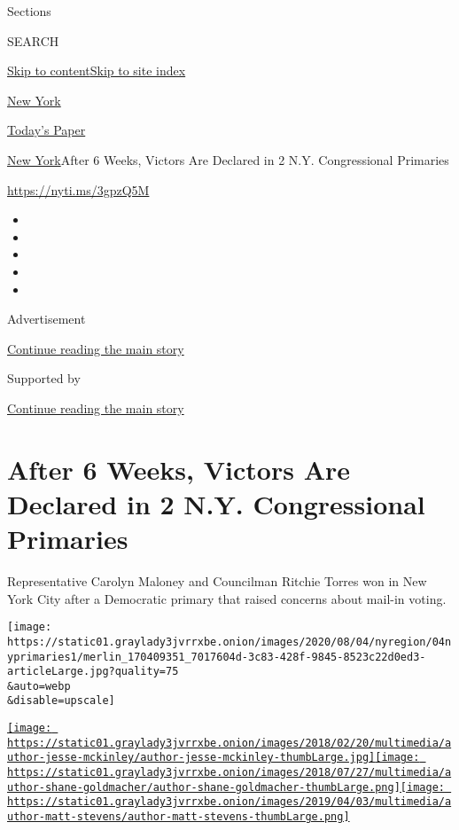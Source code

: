Sections

SEARCH

\protect\hyperlink{site-content}{Skip to
content}\protect\hyperlink{site-index}{Skip to site index}

\href{https://www.nytimes3xbfgragh.onion/section/nyregion}{New York}

\href{https://myaccount.nytimes3xbfgragh.onion/auth/login?response_type=cookie\&client_id=vi}{}

\href{https://www.nytimes3xbfgragh.onion/section/todayspaper}{Today's
Paper}

\href{/section/nyregion}{New York}\textbar{}After 6 Weeks, Victors Are
Declared in 2 N.Y. Congressional Primaries

\url{https://nyti.ms/3gpzQ5M}

\begin{itemize}
\item
\item
\item
\item
\item
\end{itemize}

Advertisement

\protect\hyperlink{after-top}{Continue reading the main story}

Supported by

\protect\hyperlink{after-sponsor}{Continue reading the main story}

\hypertarget{after-6-weeks-victors-are-declared-in-2-ny-congressional-primaries}{%
\section{After 6 Weeks, Victors Are Declared in 2 N.Y. Congressional
Primaries}\label{after-6-weeks-victors-are-declared-in-2-ny-congressional-primaries}}

Representative Carolyn Maloney and Councilman Ritchie Torres won in New
York City after a Democratic primary that raised concerns about mail-in
voting.

\texttt{[image: https://static01.graylady3jvrrxbe.onion/images/2020/08/04/nyregion/04nyprimaries1/merlin\_170409351\_7017604d-3c83-428f-9845-8523c22d0ed3-articleLarge.jpg?quality=75\\\&auto=webp\\\&disable=upscale]}

\href{https://www.nytimes3xbfgragh.onion/by/jesse-mckinley}{\texttt{[image: https://static01.graylady3jvrrxbe.onion/images/2018/02/20/multimedia/author-jesse-mckinley/author-jesse-mckinley-thumbLarge.jpg]}}\href{https://www.nytimes3xbfgragh.onion/by/shane-goldmacher}{\texttt{[image: https://static01.graylady3jvrrxbe.onion/images/2018/07/27/multimedia/author-shane-goldmacher/author-shane-goldmacher-thumbLarge.png]}}\href{https://www.nytimes3xbfgragh.onion/by/matt-stevens}{\texttt{[image: https://static01.graylady3jvrrxbe.onion/images/2019/04/03/multimedia/author-matt-stevens/author-matt-stevens-thumbLarge.png]}}

